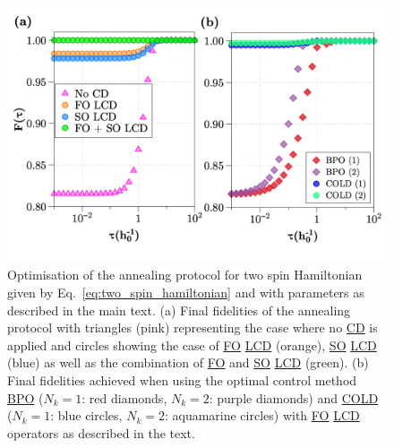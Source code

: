 \documentclass[a4paper,oneside,11pt]{book}
\newcommand{\acrref}[1]{\hyperref[acr:#1]{#1}}
\begin{document}
\begin{figure}[t]
    \centering
    \includegraphics[width=0.8\linewidth]{images/twospins_fidelities.png} \caption[COLD applied to two-spin annealing]{Optimisation of the annealing protocol for two spin Hamiltonian given by Eq.~\eqref{eq:two_spin_hamiltonian} and with parameters as described in the main text.  (a) Final fidelities of the annealing protocol with triangles (pink) representing the case where no \acrref{CD} is applied and circles showing the case of \acrref{FO} \acrref{LCD} (orange), \acrref{SO} \acrref{LCD} (blue) as well as the combination of \acrref{FO} and \acrref{SO} \acrref{LCD} (green). (b) Final fidelities achieved when using the optimal control method \acrref{BPO} ($N_k = 1$: red diamonds, $N_k = 2$: purple diamonds) and \acrref{COLD} ($N_k = 1$: blue circles, $N_k = 2$: aquamarine circles) with \acrref{FO} \acrref{LCD} operators as described in the text.}\label{fig:twospin_fidelities}
\end{figure}
\end{document}
